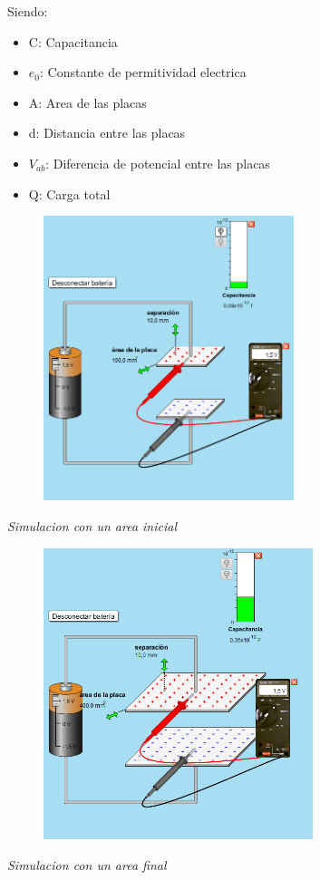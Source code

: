 \documentclass[12pt]{report}
\begin{document}
\begin{enumerate}
    Siendo:\\
    \begin{itemize}
        \item C: Capacitancia
        \item $e_0$: Constante de permitividad electrica
        \item A: Area de las placas
        \item d: Distancia entre las placas
        \item $V_{ab}$: Diferencia de potencial entre las placas
        \item Q: Carga total
        \end{itemize}


\begin{figure}[h]
    \centering
    \includegraphics[width=0.65\textwidth]{./images/1FOTO3.png}
\end{figure}
    \textit{Simulacion con un area inicial}
    
         \vspace{13cm}


\begin{figure}[h]
    \centering
    \includegraphics[width=0.7\textwidth]{./images/1FOTO4.png}
\end{figure}
    \textit{Simulacion con un area final}



\end{enumerate}
\end{document}
